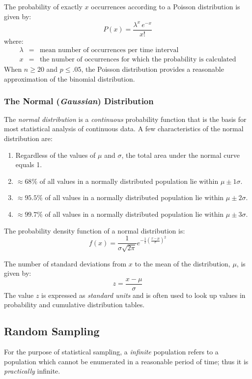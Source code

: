 \documentclass[12pt]{article}
\begin{document}
The probability of exactly $x$ occurrences according to a Poisson distribution is given by:
\begin{equation}
P(x) = \frac{{\lambda}^x \, e^{-x}}{x!}
\end{equation}
where:
\begin{eqnarray}
\lambda & = & \textrm{mean number of occurrences per time interval} \nonumber \\
x & = & \textrm{the number of occurrences for which the probability is calculated} \nonumber
\end{eqnarray}
When $n \ge 20$ and $p \le .05$, the Poisson distribution provides a reasonable approximation of the binomial distribution.

\subsubsection{The Normal (\textit{Gaussian}) Distribution}
The \textit{normal distribution} is a \textit{continuous} probability function that is the basis for most statistical analysis of continuous data. A few characteristics of the normal distribution are:
\begin{enumerate}
\item Regardless of the values of $\mu$ and $\sigma$, the total area under the normal curve equals 1.
\item $\approx 68\%$ of all values in a normally distributed population lie within $\mu \pm 1\sigma$.
\item $\approx 95.5\%$ of all values in a normally distributed population lie within $\mu \pm 2\sigma$.
\item $\approx 99.7\%$ of all values in a normally distributed population lie within $\mu \pm 3\sigma$.
\end{enumerate}
The probability density function of a normal distribution is:
\begin{equation}
f(x) = \frac{1}{\sigma \sqrt{2\pi}}e^{-\frac{1}{2}(\frac{x-\mu}{\sigma})^2}
\end{equation}

The number of standard deviations from $x$ to the mean of the distribution, $\mu$, is given by:
\begin{equation}
z = \frac{x-\mu}{\sigma}
\end{equation}
The value $z$ is expressed as \textit{standard units} and is often used to look up values in probability and cumulative distribution tables.

\subsection{Random Sampling}
For the purpose of statistical sampling, a \textit{infinite} population refers to a population which cannot be enumerated in a reasonable period of time; thus it is \textit{practically} infinite.
\end{document}
